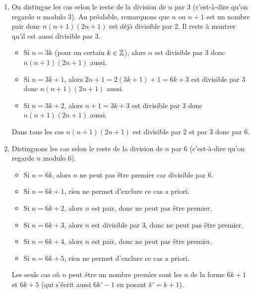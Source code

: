 \documentclass[11pt,class=report,crop=false]{standalone}
\begin{document}
\correction
\sauteligne
\begin{enumerate}
    \item On distingue les cas selon le reste de la division de $n$ par $3$ (c'est-à-dire qu'on regarde $n$ modulo $3$).
    Au préalable, remarquons que $n$ ou $n+1$ est un nombre pair donc $n(n+1)(2n+1)$ est déjà divisible par $2$. Il reste à montrer qu'il est aussi divisible par $3$.
    \begin{itemize}
        \item Si $n=3k$ (pour un certain $k\in\mathbb{Z}$), alors $n$ est divisible par $3$ donc $n(n+1)(2n+1)$ aussi.
        
        \item Si $n=3k+1$, alors $2n+1 = 2(3k+1)+1 = 6k+3$ est divisible par $3$ donc $n(n+1)(2n+1)$ aussi.    
            
        \item Si $n=3k+2$, alors $n+1 = 3k+3$ est divisible par $3$ donc $n(n+1)(2n+1)$ aussi.           
     \end{itemize}
  Dans tous les cas   $n(n+1)(2n+1)$ est divisible par $2$ et par $3$ donc par $6$.
    
    \item Distinguons les cas selon le reste de la division de $n$ par $6$ (c'est-à-dire qu'on regarde $n$ modulo $6$).
    \begin{itemize}
    \item Si $n=6k$, alors $n$ ne peut pas être premier car divisible par $6$.
    
    \item Si $n=6k+1$, rien ne permet d'exclure ce cas a priori.
    
    \item Si $n=6k+2$, alors $n$ est pair, donc ne peut pas être premier.
       
    \item Si $n=6k+3$, alors $n$ est divisible par $3$, donc ne peut pas être premier.    
    
    \item Si $n=6k+4$, alors $n$ est pair, donc ne peut pas être premier.    
    
   \item Si $n=6k+5$, rien ne permet d'exclure ce cas a priori.        
\end{itemize}
Les seuls cas où $n$ peut être un nombre premier sont les $n$ de la forme $6k+1$ et $6k+5$ (qui s'écrit aussi $6k'-1$ en posant $k'=k+1$).
  
\end{enumerate}
\fincorrection
\finexercice
\end{document}
